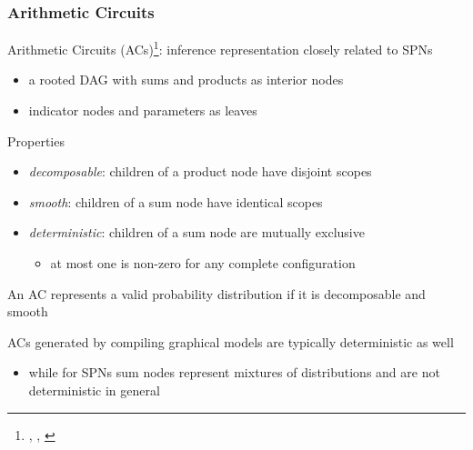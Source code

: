 \documentclass[10pt, t, xcolor={usenames,dvipsnames,svgnames}, compress]{beamer}
\newcommand{\customcite}[1]{\footnote{\scriptsize \citeauthor{#1}, \citetitle{#1}, \citeyear{#1}}}
\begin{document}
\begin{frame}
  \frametitle{Arithmetic Circuits}
Arithmetic Circuits (ACs)\customcite{Darwiche2003}: inference representation closely related to SPNs
\begin{itemize} 
\item a rooted DAG with sums and products as interior nodes
\item indicator nodes and parameters as leaves
\end{itemize}
Properties
\begin{itemize}
\item \emph{decomposable}: children of a product node have disjoint scopes
\item \emph{smooth}: children of a sum node have identical scopes
\item \emph{deterministic}: children  of  a  sum  node  are  mutually  exclusive
\begin{itemize}
\item at most one is non-zero for any complete configuration
\end{itemize}
\end{itemize}

An  AC  represents  a  valid  probability  distribution  if  it  is decomposable
and smooth

ACs generated by compiling graphical models are typically deterministic as well
\begin{itemize}
\item while for SPNs  sum nodes represent mixtures of distributions and are not
deterministic in general
\end{itemize}

\end{frame}
\end{document}
